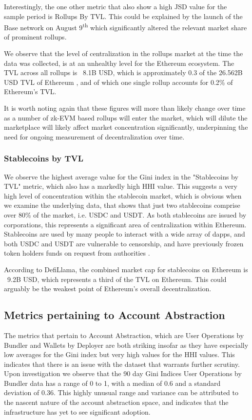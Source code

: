 \documentclass[conference]{IEEEtran}
\begin{document}
Interestingly, the one other metric that also show a high JSD value for the sample period is Rollups By TVL.  This could be explained by the launch of the Base network on August 9\textsuperscript{th} which significantly altered the relevant market share of prominent rollups.

We observe that the level of centralization in the rollups market at the time the data was collected, is at an unhealthy level for the Ethereum ecosystem.  The TVL across all rollups is ~8.1B USD, which is approximately 0.3 of the 26.562B USD TVL of Ethereum \cite{defillama}, and of which one single rollup accounts for 0.2\% of Ethereum's TVL.

It is worth noting again that these figures will more than likely change over time as a number of zk-EVM based rollups will enter the market, which will dilute the marketplace will likely affect market concentration significantly, underpinning the need for ongoing measurement of decentralization over time.

\subsubsection{Stablecoins by TVL}

We observe the highest average value for the Gini index in the "Stablecoins by TVL" metric, which also has a markedly high HHI value.  This suggests a very high level of concentration within the stablecoin market, which is obvious when we examine the underlying data, that shows that just two stablecoins comprise over 80\% of the market, i.e. USDC and USDT. As both stablecoins are issued by corporations, this represents a significant area of centralization within Ethereum.  Stablecoins are used by many people to interact with a wide array of dapps, and both USDC and USDT are vulnerable to censorship, and have previously frozen token holders funds on request from authorities \cite{haqshanas2022} \cite{de2022}.

According to DefiLlama\cite{defillama}, the combined market cap for stablecoins on Ethereum is ~9.2B USD, which represents a third of the TVL on Ethereum.  This could arguably be the weakest point of Ethereum's overall decentralization.

\subsection{Metrics pertaining to Account Abstraction}

The metrics that pertain to Account Abstraction, which are User Operations by Bundler and Wallets by Deployer are both striking insofar as they have especially low averages for the Gini index but very high values for the HHI values.  This indicates that there is an issue with the dataset that warrants further scrutiny.  Upon investigation we observe that the 90 day Gini Indices User Operations by Bundler data has a range of 0 to 1, with a median of 0.6 and a standard deviation of 0.36.  This highly unusual range and variance can be attributed to the nascent nature of the account abstraction space, and indicates that the infrastructure has yet to see significant adoption.
\end{document}
